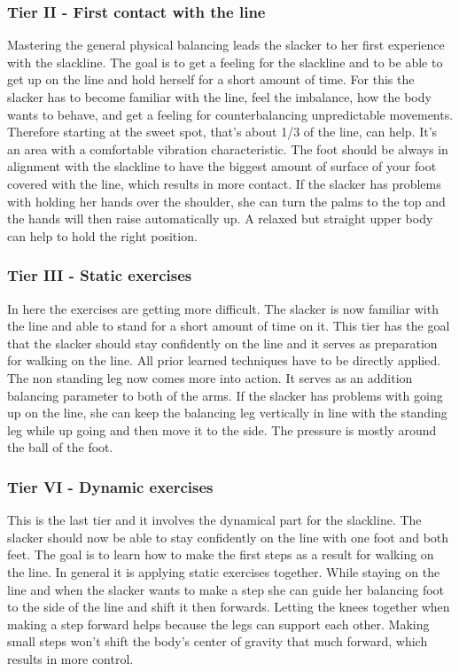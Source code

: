 \subsubsection{Tier II - First contact with the line}
Mastering the general physical balancing leads the slacker to her first experience with the slackline. The goal is to get a feeling for the slackline and to be able to get up on the line and hold herself for a short amount of time. For this the slacker has to become familiar with the line, feel the imbalance, how the body wants to behave, and get a feeling for counterbalancing unpredictable movements. Therefore starting at the sweet spot, that's about 1/3 of the line, can help. It's an area with a comfortable vibration characteristic. The foot should be always in alignment with the slackline to have the biggest amount of surface of your foot covered with the line, which results in more contact. If the slacker has problems with holding her hands over the shoulder, she can turn the palms to the top and the hands will then raise automatically up. A relaxed but straight upper body can help to hold the right position.

\subsubsection{Tier III - Static exercises}
In here the exercises are getting more difficult. The slacker is now familiar with the line and able to stand for a short amount of time on it. This tier has the goal that the slacker should stay confidently on the line and it serves as preparation for walking on the line. All prior learned techniques have to be directly applied. The non standing leg now comes more into action. It serves as an addition balancing parameter to both of the arms. If the slacker has problems with going up on the line, she can keep the balancing leg vertically in line with the standing leg while up going and then move it to the side. The pressure is mostly around the ball of the foot.

\subsubsection{Tier VI - Dynamic exercises}
This is the last tier and it involves the dynamical part for the slackline. The slacker should now be able to stay confidently on the line with one foot and both feet. The goal is to learn how to make the first steps as a result for walking on the line. In general it is applying static exercises together. While staying on the line and when the slacker wants to make a step she can guide her balancing foot to the side of the line and shift it then forwards. Letting the knees together when making a step forward helps because the legs can support each other. Making small steps won't shift the body's center of gravity that much forward, which results in more control.
